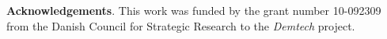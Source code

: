 \documentclass[creativecommons]{eptcs/eptcs}
\begin{document}
\vspace*{0.3em}
{\bf Acknowledgements}. This work was funded by the grant number 10-092309
from the Danish Council for Strategic Research to the \emph{Demtech} project.
\vspace*{-0.6em}

\begin{raggedright}


\end{raggedright}
\end{document}
